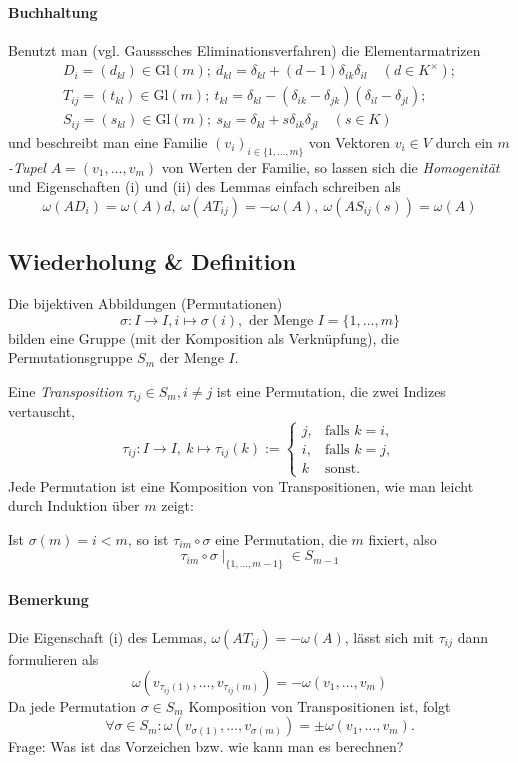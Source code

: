 \paragraph{Buchhaltung}
	Benutzt man (vgl. Gausssches Eliminationsverfahren) die Elementarmatrizen
	\begin{gather*}
		D_i = (d_{kl}) \in \mathrm{Gl}(m);\ d_{kl} = \delta_{kl}+(d-1)\delta_{ik}\delta_{il}\quad (d\in K^\times);\\
		T_{ij} = (t_{kl}) \in \mathrm{Gl}(m);\ t_{kl} = \delta_{kl}-(\delta_{ik}-\delta_{jk})(\delta_{il}-\delta_{jl});\\
		S_{ij} = (s_{kl})\in \mathrm{Gl}(m);\ s_{kl}=\delta_{kl}+s\delta_{ik}\delta_{jl}\quad (s\in K)
	\end{gather*}
	und beschreibt man eine Familie $ (v_i)_{i\in \{1,\dots,m\}} $ von Vektoren $ v_i\in V $ durch ein \emph{$ m $-Tupel} $ A=(v_1,\dots,v_m) $ von Werten der Familie, so lassen sich die \emph{Homogenität} und Eigenschaften (i) und (ii) des Lemmas einfach schreiben als
		\[ \omega(AD_i) = \omega(A)d,\ \omega(AT_{ij}) = -\omega(A),\ \omega(AS_{ij}(s)) = \omega(A) \]
\subsection{Wiederholung \& Definition}
	Die bijektiven Abbildungen (Permutationen)
		\[ \sigma: I\to I, i\mapsto \sigma(i),\text{ der Menge }I = \{1,\dots,m\} \]
	bilden eine Gruppe (mit der Komposition als Verknüpfung), die Permutationsgruppe $ S_m $ der Menge $ I $.
	\begin{Definition}[Transposition]
	Eine \emph{Transposition} $ \tau_{ij} \in S_m, i\neq j $ ist eine Permutation, die zwei Indizes vertauscht,
		\[ \tau_{ij}:I\to I,\ k\mapsto \tau_{ij}(k):=
		\begin{cases}
			j, &\text{falls } k=i,\\
			i, &\text{falls } k=j,\\
			k & \text{sonst}.
		\end{cases} \]
	Jede Permutation ist eine Komposition von Transpositionen, wie man leicht durch Induktion über $m$ zeigt:
	
	Ist $ \sigma(m) = i<m$, so ist $ \tau_{im}\circ \sigma $ eine Permutation, die $ m $ fixiert, also
		\[ \tau_{im}\circ\sigma\mid_{\{1,\dots,m-1\}}\in S_{m-1} \]
	\end{Definition}
\paragraph{Bemerkung}
	Die Eigenschaft (i) des Lemmas, $ \omega(AT_{ij})=-\omega(A) $, lässt sich mit $ \tau_{ij} $ dann formulieren als
		\[ \omega(v_{\tau_{ij}(1)}, \dots, v_{\tau_{ij}(m)}) = - \omega(v_1,\dots,v_m) \]
	Da jede Permutation $ \sigma\in S_m $ Komposition von Transpositionen ist, folgt
		\[ \forall \sigma\in S_m: \omega(v_{\sigma(1)},\dots,v_{\sigma(m)})=\pm \omega(v_1,\dots,v_{m}). \]
	Frage: Was ist das Vorzeichen bzw. wie kann man es berechnen?
